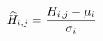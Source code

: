 \documentclass[preview]{standalone}
\begin{document}
\begin{align*}
\special{dvisvgm:raw <g id='unique000'>}\widehat{H}_{i,j} = \frac{H_{i,j} - \mu_i}{\sigma_i}\special{dvisvgm:raw </g>}
\end{align*}
\end{document}
